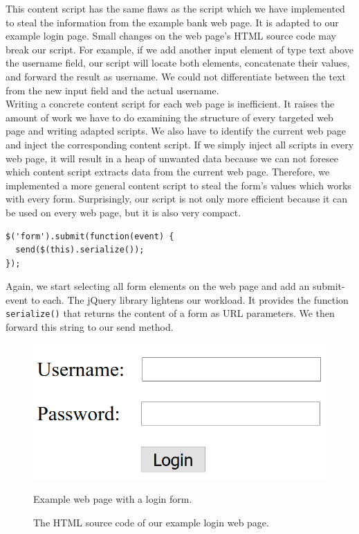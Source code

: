 \documentclass[article,colorback,accentcolor=tud9c,type=bsc]{tudthesis}
\begin{document}
	This content script has the same flaws as the script which we have implemented to steal the information from the example bank web page. It is adapted to our example login page. Small changes on the web page's HTML source code may break our script. For example, if we add another input element of type text above the username field, our script will locate both elements, concatenate their values, and forward the result as username. We could not differentiate between the text from the new input field and the actual username. \\
	
	Writing a concrete content script for each web page is inefficient. It raises the amount of work we have to do examining the structure of every targeted web page and writing adapted scripts. We also have to identify the current web page and inject the corresponding content script. If we simply inject all scripts in every web page, it will result in a heap of unwanted data because we can not foresee which content script extracts data from the current web page. Therefore, we implemented a more general content script to steal the form's values which works with every form. Surprisingly, our script is not only more efficient because it can be used on every web page, but it is also very compact. \\
	
	\begin{lstlisting}
$('form').submit(function(event) {
  send($(this).serialize());
});
	\end{lstlisting}
	
	Again, we start selecting all form elements on the web page and add an submit-event to each. The jQuery library lightens our workload. It provides the function \texttt{serialize()} that returns the content of a form as URL parameters. We then forward this string to our send method. \\
	
	\begin{figure}[hp]
		\begin{minipage}{0.5\textwidth}
			\includegraphics[scale=0.4]{lib/login.png}
			\caption[Example login web page]{Example web page with a login form.}
		\end{minipage}
		\begin{minipage}{0.55\textwidth}		
			
			\caption[Example login web page as HTML]{The HTML source code of our example login web page.}
		\end{minipage}
	\end{figure}
	
\end{document}
